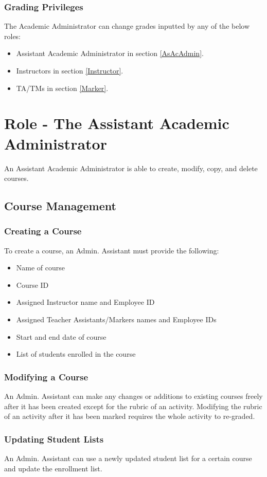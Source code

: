 \documentclass{article}
\begin{document}
\subsubsection{Grading Privileges}
The Academic Administrator can change grades inputted by any of the below roles:
\begin{itemize}
  \item Assistant Academic Administrator in section \ref{AsAcAdmin}.
  \item Instructors  in section \ref{Instructor}.
  \item TA/TMs in section \ref{Marker}.
\end{itemize}

\section{Role - The Assistant Academic Administrator \label{AsAcAdmin}}
An Assistant Academic Administrator is able to create, modify, copy, and delete courses.
\subsection {Course Management}
\subsubsection{Creating a Course \label{courseCreation}}
To create a course, an Admin. Assistant must provide the following:
\begin{itemize}
	\item Name of course
	\item Course ID
	\item Assigned Instructor name and Employee ID
	\item Assigned Teacher Assistants/Markers names and Employee IDs
	\item Start and end date of course
	\item List of students enrolled in the course
\end{itemize}
\subsubsection{Modifying a Course\label{modifying}}
An Admin. Assistant can make any changes or additions to existing courses
freely after it has been created except for the rubric of an activity. Modifying the rubric of an activity after it has been marked requires the whole
activity to re-graded.

\subsubsection{Updating Student Lists}
An Admin. Assistant can use a newly updated student list for a certain course and update the enrollment list.
\end{document}
